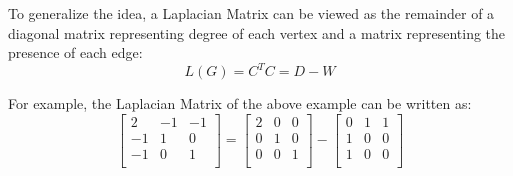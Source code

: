 To generalize the idea, a Laplacian Matrix can be viewed as the remainder of a diagonal matrix representing degree of each vertex and a matrix representing the presence of each edge:
\[
    L(G) = C^TC = D - W
\]

For example, the Laplacian Matrix of the above example can be written as:
\[
    \begin{bmatrix}
        2 & -1 &  -1 \\
        -1 & 1 &  0 \\
        -1 & 0 &  1 \\
    \end{bmatrix}
    =
    \begin{bmatrix}
        2 & 0 &  0 \\
        0 & 1 &  0 \\
        0 & 0 &  1 \\
    \end{bmatrix} 
    -
    \begin{bmatrix}
        0 & 1 &  1 \\
        1 & 0 &  0 \\
        1 & 0 &  0 \\
    \end{bmatrix}
\]



